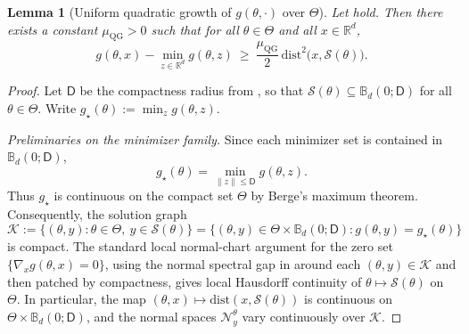 \documentclass{article}
\theoremstyle{normaltheorem}
\newtheorem{lemma}[lemma]{Lemma}
\newcommand{\R}{\mathbb{R}}
\newcommand{\calS}{\mathcal{S}}
\newcommand{\calN}{\mathcal{N}}
\begin{document}
\begin{lemma}[Uniform quadratic growth of $g(\theta,\cdot)$ over $\Theta$]\label{lem:uniform-qg-g}
Let  hold.
Then there exists a constant $\mu_{\mathrm{QG}}>0$ such that for all $\theta\in\Theta$ and all $x\in\R^d$,
\begin{equation}\label{eq:global-qg-g}
g(\theta,x)-\min_{z\in\R^d}g(\theta,z)
\ \ge\
\frac{\mu_{\mathrm{QG}}}{2}\,\mathrm{dist}^2\!\bigl(x,\calS(\theta)\bigr).
\end{equation}
\end{lemma}

\begin{proof}
Let $\mathsf D$ be the compactness radius from , so that
$\calS(\theta)\subseteq \mathbb B_d(0;\mathsf D)$ for all $\theta\in\Theta$.
Write $g_\star(\theta):=\min_{z}g(\theta,z)$.

\emph{Preliminaries on the minimizer family.}
Since each minimizer set is contained in \(\mathbb B_d(0;\mathsf D)\),
\[
g_\star(\theta)=\min_{\|z\|\le \mathsf D} g(\theta,z).
\]
Thus \(g_\star\) is continuous on the compact set \(\Theta\) by Berge's maximum theorem. Consequently, the solution graph
\[
\mathcal K:=\{(\theta,y):\theta\in\Theta,\ y\in\calS(\theta)\}
=\{(\theta,y)\in\Theta\times \mathbb B_d(0;\mathsf D): g(\theta,y)=g_\star(\theta)\}
\]
is compact. The standard local normal-chart argument for the zero set \(\{\nabla_x g(\theta,x)=0\}\), using the normal
spectral gap in \Cref{prop:geometry} around each \((\theta,y)\in\mathcal K\) and then patched by compactness, gives local Hausdorff continuity of
\(\theta\mapsto\calS(\theta)\) on \(\Theta\). In particular, the map
\((\theta,x)\mapsto \mathrm{dist}(x,\calS(\theta))\) is continuous on \(\Theta\times \mathbb B_d(0;\mathsf D)\), and the
normal spaces \(\calN_y^\theta\) vary continuously over \(\mathcal K\).


\end{proof}
\end{document}
